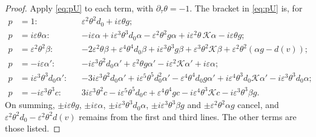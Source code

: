 \documentclass[11pt]{article}
\newcommand{\eps}{\varepsilon}
\newcommand{\cK}{\mathcal{K}}
\theoremstyle{remark}
\begin{document}
\begin{proof}
Apply \eqref{eq:pU} to each term, with $\partial_\tau\theta=-1$. The
bracket in \eqref{eq:pU} is, for
\begin{align*}
  p&=1: &&\eps^2\theta^2d_0+i\eps\theta g;\\
  p&=i\eps\theta\alpha: &&-i\eps\alpha+i\eps^3\theta^3d_0\alpha
     -\eps^2\theta^2g\alpha+i\eps^2\theta\,\cK\alpha-i\eps\theta g;\\
  p&=\eps^2\theta^2\beta: &&-2\eps^2\theta\beta+\eps^4\theta^4d_0\beta
     +i\eps^3\theta^3g\beta+\eps^3\theta^2\cK\beta+\eps^2\theta^2(\alpha g-d(v));\\
  p&=-i\eps\alpha': &&-i\eps^3\theta^2d_0\alpha'+\eps^2\theta g\alpha'
     -i\eps^2\cK\alpha'+i\eps\alpha;\\
  p&=i\eps^3\theta^3d_0\alpha': &&-3i\eps^3\theta^2d_0\alpha'
     +i\eps^5\theta^5d_0^2\alpha'-\eps^4\theta^4d_0g\alpha'
     +i\eps^4\theta^3d_0\cK\alpha'-i\eps^3\theta^3d_0\alpha;\\
  p&=-i\eps^3\theta^3c: &&3i\eps^3\theta^2c-i\eps^5\theta^5d_0c
     +\eps^4\theta^4gc-i\eps^4\theta^3\cK c-i\eps^3\theta^3\beta g.
\end{align*}
On summing, $\pm i\eps\theta g$, $\pm i\eps\alpha$,
$\pm i\eps^3\theta^3d_0\alpha$, $\pm i\eps^3\theta^3\beta g$ and
$\pm\eps^2\theta^2\alpha g$ cancel, and
$\eps^2\theta^2d_0-\eps^2\theta^2d(v)$ remains from the first and third
lines. The other terms are those listed.
\end{proof}
\end{document}
